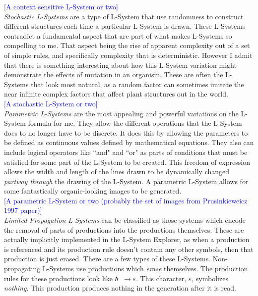 \documentclass[12pt,twoside]{reedthesis}
\newcommand{\code}[1]{\texttt{#1}}
\begin{document}
	\textcolor{blue}{[A context sensitive L-System or two]}\\
	
	\textit{Stochastic L-Systems} are a type of L-System that use randomness to construct different structures each time a particular L-System is drawn. These L-Systems contradict a fundamental aspect that are part of what makes L-Systems so compelling to me. That aspect being the rise of apparent complexity out of a set of simple rules, and specifically complexity that is deterministic. However I admit that there is something interesting about how this L-System variation might demonstrate the effects of mutation in an organism. These are often the L-Systems that look most natural, as a random factor can sometimes imitate the near infinite complex factors that affect plant structures out in the world.\\
	
	\textcolor{blue}{[A stochastic L-System or two]}\\
	
	\textit{Parametric L-Systems} are the most appealing and powerful variations on the L-System formula for me. They allow the different operations that the L-System does to no longer have to be discrete. It does this by allowing the parameters to be defined as continuous values defined by mathematical equations. They also can include logical operators like ``and" and ``or" as parts of conditions that must be satisfied for some part of the L-System to be created. This freedom of expression allows the width and length of the lines drawn to be dynamically changed \textit{partway through} the drawing of the L-System. A parametric L-System allows for some fantastically organic-looking images to be generated.\\
	
	\textcolor{blue}{[A parametric L-System or two (probably the set of images from Prusinkieweicz 1997 paper)]}\\
	
	\textit{Limited-Propagation L-Systems} can be classified as those systems which encode the removal of parts of productions into the productions themselves. These are actually implicitly implemented in the L-System Explorer, as when a production is referenced and its production rule doesn't contain any other symbols, then that production is just erased. There are a few types of these L-Systems. Non-propagating L-Systems use productions which \textit{erase} themselves. The production rules for these productions look like \code{A $\rightarrow \varepsilon$}. This character, $\varepsilon$, symbolizes \textit{nothing}. This production produces nothing in the generation after it is read. \\
	
\end{document}
